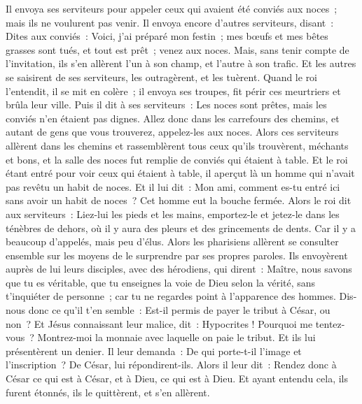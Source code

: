 \begin{multicols}{2}
Il envoya ses serviteurs pour appeler ceux qui avaient été conviés aux noces~; mais ils ne voulurent pas venir.
Il envoya encore d'autres serviteurs, disant~: Dites aux conviés~: Voici, j'ai préparé mon festin~; mes bœufs et mes bêtes grasses sont tués, et tout est prêt~; venez aux noces.
Mais, sans tenir compte de l'invitation, ils s'en allèrent l'un à son champ, et l'autre à son trafic.
Et les autres se saisirent de ses serviteurs, les outragèrent, et les tuèrent.
Quand le roi l'entendit, il se mit en colère~; il envoya ses troupes, fit périr ces meurtriers et brûla leur ville.
Puis il dit à ses serviteurs~: Les noces sont prêtes, mais les conviés n'en étaient pas dignes.
Allez donc dans les carrefours des chemins, et autant de gens que vous trouverez, appelez-les aux noces.
Alors ces serviteurs allèrent dans les chemins et rassemblèrent tous ceux qu'ils trouvèrent, méchants et bons, et la salle des noces fut remplie de conviés qui étaient à table.
Et le roi étant entré pour voir ceux qui étaient à table, il aperçut là un homme qui n'avait pas revêtu un habit de noces.
Et il lui dit~: Mon ami, comment es-tu entré ici sans avoir un habit de noces~? Cet homme eut la bouche fermée.
Alors le roi dit aux serviteurs~: Liez-lui les pieds et les mains, emportez-le et jetez-le dans les ténèbres de dehors, où il y aura des pleurs et des grincements de dents.
Car il y a beaucoup d'appelés, mais peu d'élus.
Alors les pharisiens allèrent se consulter ensemble sur les moyens de le surprendre par ses propres paroles.
Ils envoyèrent auprès de lui leurs disciples, avec des hérodiens, qui dirent~: Maître, nous savons que tu es véritable, que tu enseignes la voie de Dieu selon la vérité, sans t'inquiéter de personne~; car tu ne regardes point à l'apparence des hommes.
Dis-nous donc ce qu'il t'en semble~: Est-il permis de payer le tribut à César, ou non~?
Et Jésus connaissant leur malice, dit~: Hypocrites ! Pourquoi me tentez-vous~?
Montrez-moi la monnaie avec laquelle on paie le tribut. Et ils lui présentèrent un denier.
Il leur demanda~: De qui porte-t-il l'image et l'inscription~?
De César, lui répondirent-ils. Alors il leur dit~: Rendez donc à César ce qui est à César, et à Dieu, ce qui est à Dieu.
Et ayant entendu cela, ils furent étonnés, ils le quittèrent, et s'en allèrent.

\end{multicols}
